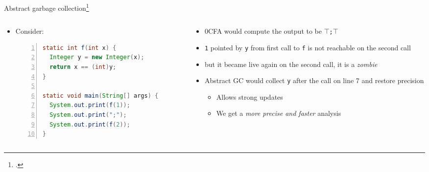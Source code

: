\documentclass[aspectratio=169]{beamer}
\begin{document}
\begin{frame}[fragile]{Abstract garbage collection\footcite{might2006improving}}
  \small\vspace{-1em}
  \begin{columns}[t]
    \begin{column}{.40\textwidth}
        \begin{itemize}
        \item Consider:
          \begin{lstlisting}[language=Java,numbers=left]
static int f(int x) {
  Integer y = new Integer(x);
  return x == (int)y;
}

static void main(String[] args) {
  System.out.print(f(1));
  System.out.print(";");
  System.out.print(f(2));
}
          \end{lstlisting}
        \end{itemize}
    \end{column}
    \begin{column}{.60\textwidth}
      \pause
      \begin{itemize}[<+->]
      \item 0CFA would compute the output to be \alert<2>{\texttt{$\top$;$\top$}}
      \item \texttt{1} pointed by \texttt{y} from first call to \texttt{f} is not reachable on the second call
      \item but it became live again on the second call, it is a \emph{zombie}
      \item Abstract GC would collect \texttt{y} after the call on line 7 and restore precision \pause
        \begin{itemize}[<+->] \footnotesize
        \item Allows strong updates
        \item We get a \alert{\emph{more precise and faster}} analysis
        \end{itemize}
      \end{itemize}
    \end{column}
  \end{columns}
\end{frame}
\end{document}
